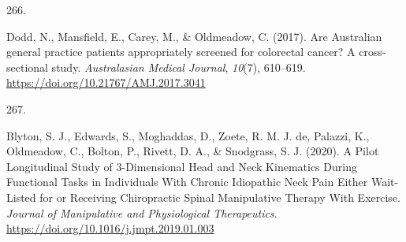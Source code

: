 \documentclass[11pt, a4paper]{awesome-cv}
\newlength{\csllabelwidth}
\newcommand{\CSLLeftMargin}[1]{\parbox[t]{\csllabelwidth}{#1}}
\newcommand{\CSLRightInline}[1]{\parbox[t]{\linewidth - \csllabelwidth}{#1}}
\begin{document}
\leavevmode\hypertarget{ref-dodd_are_2017}{}%
\CSLLeftMargin{266. }
\CSLRightInline{Dodd, N., Mansfield, E., Carey, M., \& Oldmeadow, C.
(2017). Are Australian general practice patients appropriately screened
for colorectal cancer? A cross-sectional study. \emph{Australasian
Medical Journal}, \emph{10}(7), 610--619.
\url{https://doi.org/10.21767/AMJ.2017.3041}}

\leavevmode\hypertarget{ref-blyton_pilot_2020}{}%
\CSLLeftMargin{267. }
\CSLRightInline{Blyton, S. J., Edwards, S., Moghaddas, D., Zoete, R. M.
J. de, Palazzi, K., Oldmeadow, C., Bolton, P., Rivett, D. A., \&
Snodgrass, S. J. (2020). A Pilot Longitudinal Study of 3-Dimensional
Head and Neck Kinematics During Functional Tasks in Individuals With
Chronic Idiopathic Neck Pain Either Wait-Listed for or Receiving
Chiropractic Spinal Manipulative Therapy With Exercise. \emph{Journal of
Manipulative and Physiological Therapeutics}.
\url{https://doi.org/10.1016/j.jmpt.2019.01.003}}
\end{document}
